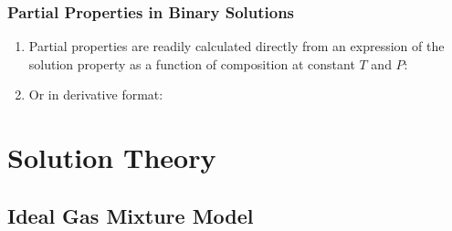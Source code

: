 \documentclass[10pt,compress,unknownkeysallowed]{beamer}
\begin{document}
\begin{frame}
  \frametitle{Partial Properties in Binary Solutions}
  \begin{enumerate}%
    \item<1->Partial properties are readily calculated directly from an expression of the solution property as a function of composition at constant $T$ and $P$:
    \item<2->Or in derivative format:
  \end{enumerate}
\end{frame}
\normalsize


\section{Solution Theory}

\subsection{Ideal Gas Mixture Model}
\end{document}

